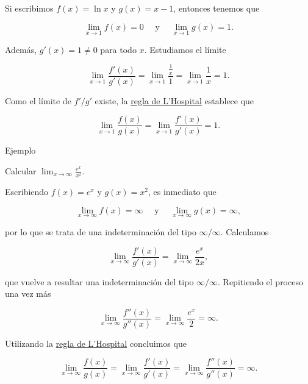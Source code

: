 \documentclass[
  letterpaper,
]{book}
\theoremstyle{plain}
\theoremstyle{remark}
\begin{document}
\begin{tcolorbox}[enhanced jigsaw, opacityback=0, left=2mm, opacitybacktitle=0.6, toprule=.15mm, bottomrule=.15mm, colbacktitle=quarto-callout-tip-color!10!white, titlerule=0mm, bottomtitle=1mm, title=\textcolor{quarto-callout-tip-color}{\faLightbulb}\hspace{0.5em}{Solución}, toptitle=1mm, colframe=quarto-callout-tip-color-frame, colback=white, breakable, rightrule=.15mm, arc=.35mm, leftrule=.75mm, coltitle=black]

Si escribimos \(f(x)=\ln x\) y \(g(x)=x-1\), entonces tenemos que

\[
\lim_{x\to 1} f(x)=0 \quad \text{ y } \quad \lim_{x\to 1} g(x)=1.
\]

Además, \(g'(x)=1\neq 0\) para todo \(x\). Estudiamos el límite

\[
\lim_{x\to 1} \frac{f'(x)}{g'(x)}=\lim_{x\to 1} \frac{\frac{1}{x}}{1}=\lim_{x\to 1} \frac{1}{x}=1.
\]

Como el límite de \(f'/g'\) existe, la \hyperref[teo-regla-LH]{regla de
L'Hospital} establece que

\[
\lim_{x\to 1} \frac{f(x)}{g(x)}=\lim_{x\to 1} \frac{f'(x)}{g'(x)}=1.
\]

\end{tcolorbox}

Ejemplo

Calcular \(\displaystyle \lim_{x\to \infty} \frac{e^x}{x^2}\).

\begin{tcolorbox}[enhanced jigsaw, opacityback=0, left=2mm, opacitybacktitle=0.6, toprule=.15mm, bottomrule=.15mm, colbacktitle=quarto-callout-tip-color!10!white, titlerule=0mm, bottomtitle=1mm, title=\textcolor{quarto-callout-tip-color}{\faLightbulb}\hspace{0.5em}{Solución}, toptitle=1mm, colframe=quarto-callout-tip-color-frame, colback=white, breakable, rightrule=.15mm, arc=.35mm, leftrule=.75mm, coltitle=black]

Escribiendo \(f(x)=e^x\) y \(g(x)=x^2\), es inmediato que

\[
\lim_{x\to \infty} f(x)=\infty \quad \text{ y } \quad \lim_{x\to \infty} g(x)=\infty,
\]

por lo que se trata de una indeterminación del tipo \(\infty/\infty\).
Calculamos

\[
\lim_{x\to \infty} \frac{f'(x)}{g'(x)}=\lim_{x\to \infty} \frac{e^x}{2x},
\]

que vuelve a resultar una indeterminación del tipo \(\infty/\infty\).
Repitiendo el proceso una vez más

\[
\lim_{x\to \infty} \frac{f''(x)}{g''(x)}=\lim_{x\to \infty} \frac{e^x}{2}=\infty.
\]

Utilizando la \hyperref[teo-regla-LH]{regla de L'Hospital} concluimos
que

\[
\lim_{x\to \infty} \frac{f(x)}{g(x)}=\lim_{x\to \infty} \frac{f'(x)}{g'(x)}=\lim_{x\to \infty} \frac{f''(x)}{g''(x)}=\infty.
\]

\end{tcolorbox}
\end{document}
